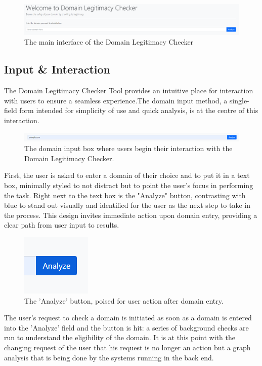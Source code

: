 \begin{figure}[H]
    \centering
    \includegraphics[width=1.1\linewidth]{project/image.png}
    \caption{The main interface of the Domain Legitimacy Checker}
    \label{fig:implem22}
\end{figure}

\subsection{Input \& Interaction}

 The Domain Legitimacy Checker Tool provides an intuitive place for interaction with users to ensure a seamless experience.The domain input method, a single-field form intended for simplicity of use and quick analysis, is at the centre of this interaction.
 
\begin{figure} [H]
    \centering
    \includegraphics[width=1.1\linewidth]{project/6.png}
    \caption{The domain input box where users begin their interaction with the Domain Legitimacy Checker.}
    \label{fig:impl2}
\end{figure}

First, the user is asked to enter a domain of their choice and to put it in a text box, minimally styled to not distract but to point the user's focus in performing the task. Right next to the text box is the "Analyze" button, contrasting with blue to stand out visually and identified for the user as the next step to take in the process. This design invites immediate action upon domain entry, providing a clear path from user input to results.

\begin{figure}[H]
    \centering
    \includegraphics[width=0.1\linewidth]{project/8.png}
    \caption{The 'Analyze' button, poised for user action after domain entry.}
    \label{fig:imple2222}
\end{figure}

The user's request to check a domain is initiated as soon as a domain is entered into the 'Analyze' field and the button is hit: a series of background checks are run to understand the eligibility of the domain. It is at this point with the changing request of the user that his request is no longer an action but a graph analysis that is being done by the systems running in the back end.

